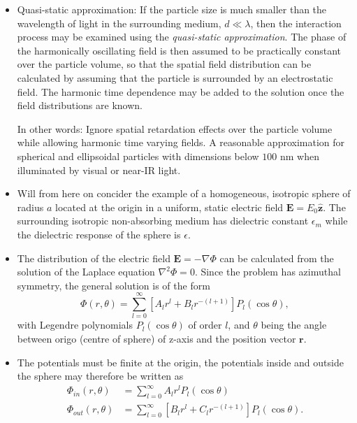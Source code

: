 \begin{itemize}
    \item Quasi-static approximation: If the particle size is much smaller than the wavelength of light in the surrounding medium, $d\ll \lambda$, then the interaction process may be examined using the \emph{quasi-static approximation}. The phase of the harmonically oscillating field is then assumed to be practically constant over the particle volume, so that the spatial field distribution can be calculated by assuming that the particle is surrounded by an electrostatic field. The harmonic time dependence may be added to the solution once the field distributions are known.
    
    In other words: Ignore spatial retardation effects over the particle volume while allowing harmonic time varying fields. A reasonable approximation for spherical and ellipsoidal particles with dimensions below $100$ nm when illuminated by visual or near-IR light.
    
    \item Will from here on concider the example of a homogeneous, isotropic sphere of radius $a$ located at the origin in a uniform, static electric field $\mathbf{E}=E_0\mathbf{\hat{z}}$. The surrounding isotropic non-absorbing medium has dielectric constant $\epsilon_m$ while the dielectric response of the sphere is $\epsilon$.
    
    \item The distribution of the electric field $\mathbf{E}=-\nabla \Phi$ can be calculated from the solution of the Laplace equation $\nabla ^2 \Phi = 0$. Since the problem has azimuthal symmetry, the general solution is of the form
    \begin{equation}
        \Phi (r,\theta) = \sum_{l=0}^\infty[A_lr^l + B_lr^{-(l+1)}] P_l(\cos\theta),
    \end{equation}
    with Legendre polynomials $P_l(\cos\theta)$ of order $l$, and $\theta$ being the angle between origo (centre of sphere) of z-axis and the position vector $\mathbf{r}$.
    
    \item The potentials must be finite at the origin, the potentials inside and outside the sphere may therefore be written as
    \begin{align}
        \Phi_{in}(r,\theta) &= \sum_{l=0}^\infty A_l r^l P_l(\cos\theta) \\
        \Phi_{out}(r,\theta) &= \sum_{l=0}^\infty [B_l r^l + C_l r^{-(l+1)}] P_l(\cos\theta). 
    \end{align}
    

\end{itemize}
